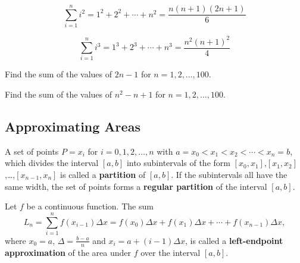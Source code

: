 \[\sum_{i=1}^n i^2=1^2+2^2+ \cdots +n^2=\dfrac{n(n+1)(2n+1)}{6}\]

\[\sum_{i=1}^n i^3=1^3+2^3+ \cdots +n^3=\dfrac{n^2(n+1)^2}{4} \]

\begin{example}

Find the sum of the values of \(2n-1\) for \(n=1,2, \dots ,100\).

\end{example}
\vspace*{6\baselineskip}

\begin{example}

Find the sum of the values of \(n^2-n+1\) for \(n=1,2, \dots ,100\).

\end{example}
\vspace*{6\baselineskip}

\hypertarget{approximating-areas}{%
\subsection{Approximating Areas}\label{approximating-areas}}

\begin{definition}

A set of points \(P={x_i}\) for \(i=0,1,2, \dots ,n\) with
\(a=x_0<x_1<x_2< \cdots <x_n=b\), which divides the interval \([a,b]\) into
subintervals of the form
\([x_0,x_1]\),\([x_1,x_2]\),\ldots,\([x_{n - 1},x_n]\) is called a
\textbf{partition} of \([a,b]\). If the subintervals all have the same
width, the set of points forms a \textbf{regular partition} of the
interval \([a,b]\).

\end{definition}

\begin{definition}

Let \(f\) be a continuous function. The sum
\[L_n=\sum\limits_{i=1}^nf(x_{i - 1})\Delta x=f(x_0)\Delta x+f(x_1)\Delta x+\cdots+f(x_{n - 1})\Delta x,\]
where \(x_0=a\), \(\Delta=\frac{b-a}{n}\) and \(x_i=a+(i-1)\Delta x\),
is called a \textbf{left-endpoint approximation} of the area under \(f\)
over the interval \([a,b]\).

\end{definition}

